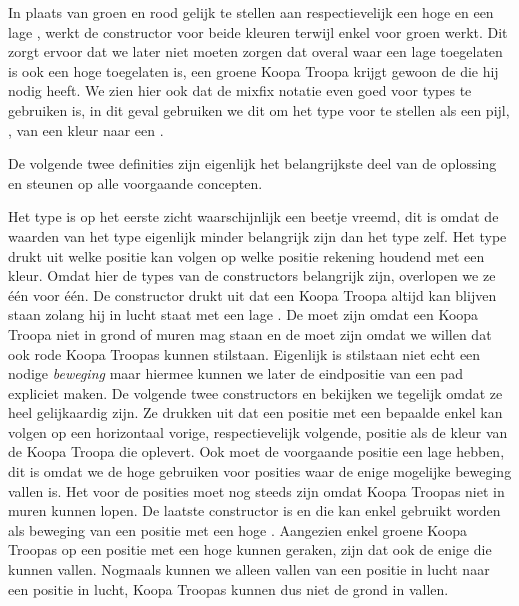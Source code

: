 
In plaats van groen en rood gelijk te stellen aan respectievelijk een hoge en
een lage , werkt de constructor  voor beide
kleuren terwijl  enkel voor groen werkt. Dit zorgt ervoor dat we
later niet moeten zorgen dat overal waar een lage  toegelaten
is ook een hoge  toegelaten is, een groene Koopa Troopa krijgt
gewoon de  die hij nodig heeft. We zien hier ook dat de mixfix
notatie even goed voor types te gebruiken is, in dit geval gebruiken we dit om
het type voor te stellen als een pijl, , van een kleur naar een
.

De volgende twee definities zijn eigenlijk het belangrijkste deel van de
oplossing en steunen op alle voorgaande concepten.


Het  type is op het eerste zicht waarschijnlijk een beetje
vreemd, dit is omdat de waarden van het type eigenlijk minder belangrijk zijn
dan het type zelf. Het type drukt uit welke positie kan volgen op welke positie
rekening houdend met een kleur. Omdat hier de types van de constructors
belangrijk zijn, overlopen we ze één voor één. De  constructor
drukt uit dat een Koopa Troopa altijd kan blijven staan zolang hij in lucht
staat met een lage . De  moet  zijn
omdat een Koopa Troopa niet in grond of muren mag staan en de 
moet  zijn omdat we willen dat ook rode Koopa Troopas kunnen
stilstaan.  Eigenlijk is stilstaan niet echt een nodige \emph{beweging} maar
hiermee kunnen we later de eindpositie van een pad expliciet maken. De volgende
twee constructors  en  bekijken we tegelijk omdat ze
heel gelijkaardig zijn. Ze drukken uit dat een positie met een bepaalde
 enkel kan volgen op een horizontaal vorige, respectievelijk
volgende, positie als de kleur van de Koopa Troopa die 
oplevert. Ook moet de voorgaande positie een lage  hebben, dit
is omdat we de hoge  gebruiken voor posities waar de enige
mogelijke beweging vallen is. Het  voor de posities moet nog
steeds  zijn omdat Koopa Troopas niet in muren kunnen lopen.  De
laatste constructor is  en die kan enkel gebruikt worden als
beweging van een positie met een hoge . Aangezien enkel groene
Koopa Troopas op een positie met een hoge  kunnen geraken,
zijn dat ook de enige die kunnen vallen. Nogmaals kunnen we alleen vallen van
een positie in lucht naar een positie in lucht, Koopa Troopas kunnen dus niet
de grond in vallen.

